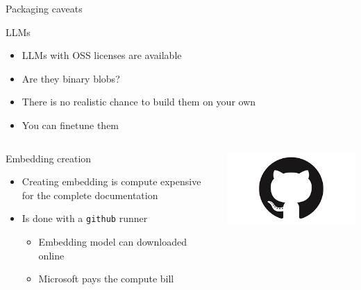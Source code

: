 \documentclass[aspectratio=169]{beamer}
\begin{document}
\begin{frame}{Packaging caveats}
\begin{block}{LLMs}
  \begin{itemize}
    \item LLMs with OSS licenses are available
    \item Are they binary blobs?
    \item There is no realistic chance to build them on your own
    \item You can finetune them
  \end{itemize}
\end{block}
\begin{columns}
\begin{block}{Embedding creation}
  \begin{itemize}
  \item Creating embedding is compute expensive for the complete documentation
  \item Is done with a \texttt{github} runner
  \begin{itemize}
    \item Embedding model can downloaded online
    \item Microsoft pays the compute bill
  \end{itemize}
  \end{itemize}
\end{block}
\includegraphics[width=.8\linewidth]{github}
\end{columns}
\end{frame}
\end{document}
